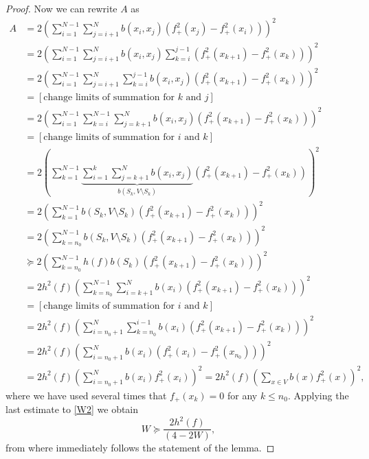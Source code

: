 \documentclass[a4paper,12pt]{amsart}
\theoremstyle{definition}
\begin{document}
\begin{proof}
Now we can rewrite $A$ as
\begin{align*}
A&=2\left(\sum_{i=1}^{N-1}\sum_{j=i+1}^N b(x_i,x_j)\left(f_+^2(x_j)-f_+^2(x_i)\right)\right)^2\\
&=2\left(\sum_{i=1}^{N-1}\sum_{j=i+1}^N b(x_i,x_j)\sum_{k=i}^{j-1}\left(f_+^2(x_{k+1})-f_+^2(x_k)\right)\right)^2\\
&=2\left(\sum_{i=1}^{N-1}\sum_{j=i+1}^N \sum_{k=i}^{j-1}b(x_i,x_j)\left(f_+^2(x_{k+1})-f_+^2(x_k)\right)\right)^2\\
&=[\mbox{change limits of summation for $k$ and $j$}]\\
&=2\left(\sum_{i=1}^{N-1}\sum_{k=i}^{N-1} \sum_{j=k+1}^{N}b(x_i,x_j)\left(f_+^2(x_{k+1})-f_+^2(x_k)\right)\right)^2\\
&=[\mbox{change limits of summation for $i$ and $k$}]\\
&=2\left(\sum_{k=1}^{N-1}\underbrace{\sum_{i=1}^{k} \sum_{j=k+1}^{N}b(x_i,x_j)}_{b(S_k,V\setminus S_k)}\left(f_+^2(x_{k+1})-f_+^2(x_k)\right)\right)^2\\
&=2\left(\sum_{k=1}^{N-1}{b(S_k,V\setminus S_k)}\left(f_+^2(x_{k+1})-f_+^2(x_k)\right)\right)^2\\
&=2\left(\sum_{k=n_0}^{N-1}{b(S_k,V\setminus S_k)}\left(f_+^2(x_{k+1})-f_+^2(x_k)\right)\right)^2\\
&\succeq 2\left(\sum_{k=n_0}^{N-1}{h(f)b(S_k)}\left(f_+^2(x_{k+1})-f_+^2(x_k)\right)\right)^2\\
&= 2h^2(f)\left(\sum_{k=n_0}^{N-1}{\sum_{i=k+1}^{N}b(x_i)}\left(f_+^2(x_{k+1})-f_+^2(x_k)\right)\right)^2\\
&=[\mbox{change limits of summation for $i$ and $k$}]\\
&=2h^2(f)\left(\sum_{i=n_0+1}^{N}{\sum_{k=n_0}^{i-1}b(x_i)}\left(f_+^2(x_{k+1})-f_+^2(x_k)\right)\right)^2\\
&=2h^2(f)\left(\sum_{i=n_0+1}^{N}{b(x_i)}\left(f_+^2(x_i)-f_+^2(x_{n_0})\right)\right)^2\\
&=2h^2(f)\left(\sum_{i=n_0+1}^{N}{b(x_i)}f_+^2(x_i)\right)^2=2h^2(f)\left(\sum_{x\in V}{b(x)}f_+^2(x)\right)^2,
\end{align*}
where we have used several times that $f_+(x_k)=0$ for any $k\le n_0$.
Applying the last estimate to \eqref{W2} we obtain 
$$
W \succeq \dfrac{2 h^2(f)}{(4-2W)},
$$
from where immediately follows the statement of the lemma.
\end{proof}
\end{document}

